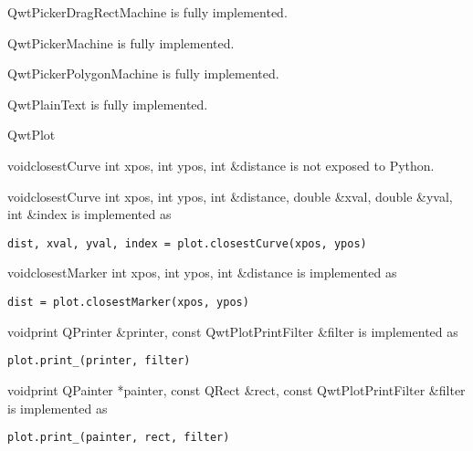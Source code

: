 \documentclass{manual}
\begin{document}
\begin{classdesc*}{QwtPickerDragRectMachine}
  is fully implemented.
\end{classdesc*}

\begin{classdesc*}{QwtPickerMachine}
  is fully implemented.
\end{classdesc*}

\begin{classdesc*}{QwtPickerPolygonMachine}
  is fully implemented.
\end{classdesc*}

\begin{classdesc*}{QwtPlainText}
  is fully implemented.
\end{classdesc*}

\begin{classdesc*}{QwtPlot}

  \begin{cfuncdesc}{void}{closestCurve}{
      int xpos, int ypos, int \&distance}
    is not exposed to Python.
  \end{cfuncdesc}

  \begin{cfuncdesc}{void}{closestCurve}{
      int xpos, int ypos, int \&distance,
      double \&xval, double \&yval, int \&index}
    is implemented as
    \begin{verbatim}
dist, xval, yval, index = plot.closestCurve(xpos, ypos)
    \end{verbatim}
  \end{cfuncdesc}

  \begin{cfuncdesc}{void}{closestMarker}{
      int xpos, int ypos, int \&distance}
    is implemented as
    \begin{verbatim}
dist = plot.closestMarker(xpos, ypos)
    \end{verbatim}
  \end{cfuncdesc}

  \begin{cfuncdesc}{void}{print}{
      QPrinter \&printer, const QwtPlotPrintFilter \&filter}
    is implemented as
    \begin{verbatim}
plot.print_(printer, filter)
    \end{verbatim}
  \end{cfuncdesc}

  \begin{cfuncdesc}{void}{print}{
      QPainter *painter,
      const QRect \&rect,
      const QwtPlotPrintFilter \&filter}
    is implemented as
    \begin{verbatim}
plot.print_(painter, rect, filter)
    \end{verbatim}
  \end{cfuncdesc}

\end{classdesc*}
\end{document}
